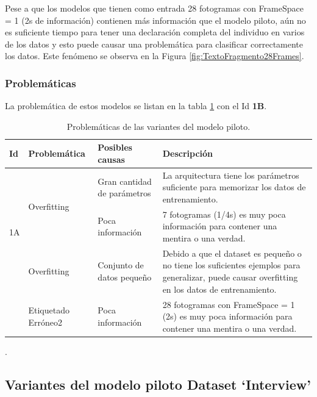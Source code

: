 \begin{onehalfspacing}
Pese a que los modelos que tienen como entrada 28 fotogramas con FrameSpace = 1 (2s de información) contienen más información que el modelo piloto, aún no es suficiente tiempo para tener una declaración completa del individuo en varios de los datos y esto puede causar una problemática para clasificar correctamente los datos. Este fenómeno se observa en la Figura \ref{fig:TextoFragmento28Frames}.


\subsubsection{Problemáticas}
\label{sec:ProblematicasVariantesModeloPilotoTrial}

La problemática de estos modelos se listan en la tabla \ref{tab:ProblematicasVariantesMPiloto} con el Id \textbf{1B}.

\begin{table}[h!]
\centering
    \begin{tabular}{|p{1cm}|p{3cm}|p{3cm}|p{7cm}|}
        \hline 
        Id & Problemática & Posibles causas & Descripción\tabularnewline
        \hline 
        \hline 
        \multirow{3}{*}{1A} & \multirow{2}{*}{Overfitting} & Gran cantidad de parámetros & La arquitectura tiene los parámetros suficiente para memorizar los
        datos de entrenamiento.\tabularnewline
        \cline{2-4} \cline{3-4} \cline{4-4} 
         & Etiquetado Erróneo & Poca información  & 7 fotogramas (1/4s) es muy poca información para contener una mentira
        o una verdad.\tabularnewline
        \hline 
        \multirow{2}{*}{1B} & Overfitting & Conjunto de datos pequeño & Debido a que el dataset es pequeño o no tiene los suficientes ejemplos
        para generalizar, puede causar overfitting en los datos de entrenamiento.\tabularnewline
        \cline{2-4} \cline{3-4} \cline{4-4} 
         & Etiquetado Erróneo2 & Poca información  & 28 fotogramas con FrameSpace = 1 (2s) es muy poca información para contener
        una mentira o una verdad.\tabularnewline
        \hline 
    \end{tabular}
    \caption{\footnotesize  Problemáticas de las variantes del modelo piloto.}.
    \label{tab:ProblematicasVariantesMPiloto}
\end{table}

\subsection{Variantes del modelo piloto Dataset `Interview'}
\label{sec:VariantesModeloPilotoInterview}


\end{onehalfspacing}
